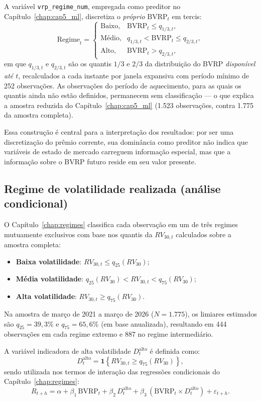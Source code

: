 A variável \texttt{vrp\_regime\_num}, empregada como preditor no
Capítulo~\ref{chap:cap5_ml}, discretiza o \emph{próprio} $\text{BVRP}_t$
em tercis:
\[
\text{Regime}_t =
\begin{cases}
\text{Baixo}, & \text{BVRP}_t \leq q_{1/3,t}, \\
\text{Médio}, & q_{1/3,t} < \text{BVRP}_t \leq q_{2/3,t}, \\
\text{Alto},  & \text{BVRP}_t > q_{2/3,t},
\end{cases}
\]
em que $q_{1/3,t}$ e $q_{2/3,t}$ são os quantis $1/3$ e $2/3$ da
distribuição do BVRP \emph{disponível até $t$}, recalculados a cada
instante por janela expansiva com período mínimo de 252 observações. As
observações do período de aquecimento, para as quais os quantis ainda não
estão definidos, permanecem sem classificação --- o que explica a amostra
reduzida do Capítulo~\ref{chap:cap5_ml} (1.523 observações, contra 1.775
da amostra completa).

Essa construção é central para a interpretação dos resultados: por ser uma
discretização do prêmio corrente, sua dominância como preditor não indica
que variáveis de estado de mercado carreguem informação especial, mas que a
informação sobre o BVRP futuro reside em seu valor presente.

\subsection{Regime de volatilidade realizada (análise condicional)}

O Capítulo~\ref{chap:regimes} classifica cada observação em um de três
regimes mutuamente exclusivos com base nos quantis da $RV_{30,t}$
calculados sobre a amostra completa:

\begin{itemize}
    \item \textbf{Baixa volatilidade}: $RV_{30,t} \leq q_{25}(RV_{30})$;
    \item \textbf{Média volatilidade}: $q_{25}(RV_{30}) < RV_{30,t} < q_{75}(RV_{30})$;
    \item \textbf{Alta volatilidade}: $RV_{30,t} \geq q_{75}(RV_{30})$.
\end{itemize}

Na amostra de março de 2021 a março de 2026 ($N = 1.775$), os limiares
estimados são $q_{25} = 39{,}3\%$ e $q_{75} = 65{,}6\%$ (em base
anualizada), resultando em 444 observações em cada regime extremo e 887
no regime intermediário.

A variável indicadora de alta volatilidade $D_t^{\text{alto}}$ é definida como:
\[
D_t^{\text{alto}} = \mathbf{1}\!\left\{RV_{30,t} \geq q_{75}(RV_{30})\right\},
\]
sendo utilizada nos termos de interação das regressões condicionais do
Capítulo~\ref{chap:regimes}:
\[
R_{t+h} = \alpha + \beta_1\,\text{BVRP}_t + \beta_2\,D_t^{\text{alto}}
          + \beta_3\,(\text{BVRP}_t \times D_t^{\text{alto}}) + \varepsilon_{t+h}.
\]

